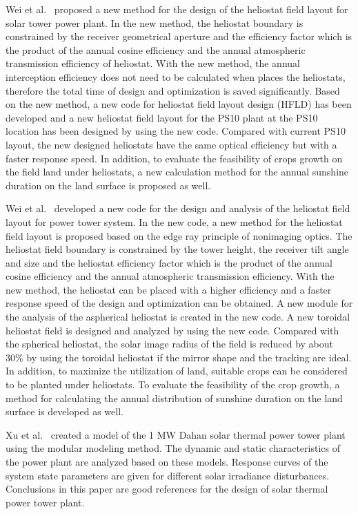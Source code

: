 Wei et al.~\cite{Wei2010} proposed a new method for the design of the heliostat field layout for solar tower power plant. In the new method, the heliostat boundary is constrained by the receiver geometrical aperture and the efficiency factor which is the product of the annual cosine efficiency and the annual atmospheric transmission efficiency of heliostat. With the new method, the annual interception efficiency does not need to be calculated when places the heliostats, therefore the total time of design and optimization is saved significantly. Based on the new method, a new code for heliostat field layout design (HFLD) has been developed and a new heliostat field layout for the PS10 plant at the PS10 location has been designed by using the new code. Compared with current PS10 layout, the new designed heliostats have the same optical efficiency but with a faster response speed. In addition, to evaluate the feasibility of crops growth on the field land under heliostats, a new calculation method for the annual sunshine duration on the land surface is proposed as well.

Wei et al.~\cite{Wei2010a} developed a new code for the design and analysis of the heliostat field layout for power tower system. In the new code, a new method for the heliostat field layout is proposed based on the edge ray principle of nonimaging optics. The heliostat field boundary is constrained by the tower height, the receiver tilt angle and size and the heliostat efficiency factor which is the product of the annual cosine efficiency and the annual atmospheric transmission efficiency. With the new method, the heliostat can be placed with a higher efficiency and a faster response speed of the design and optimization can be obtained. A new module for the analysis of the aspherical heliostat is created in the new code. A new toroidal heliostat field is designed and analyzed by using the new code. Compared with the spherical heliostat, the solar image radius of the field is reduced by about 30\% by using the toroidal heliostat if the mirror shape and the tracking are ideal. In addition, to maximize the utilization of land, suitable crops can be considered to be planted under heliostats. To evaluate the feasibility of the crop growth, a method for calculating the annual distribution of sunshine duration on the land surface is developed as well.

Xu et al.~\cite{Xu2011a} created a model of the 1 MW Dahan solar thermal power tower plant using the modular modeling method. The dynamic and static characteristics of the power plant are analyzed based on these models. Response curves of the system state parameters are given for different solar irradiance disturbances. Conclusions in this paper are good references for the design of solar thermal power tower plant.

